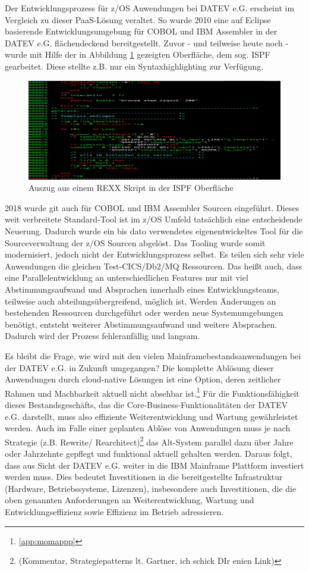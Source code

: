 Der Entwicklungsprozess für z/OS Anwendungen bei DATEV e.G. erscheint im Vergleich zu dieser PaaS-Lösung veraltet.
So wurde 2010 eine auf Eclipse basierende Entwicklungsumgebung für COBOL und IBM Assembler in der DATEV e.G. flächendeckend bereitgestellt.
Zuvor - und teilweise heute noch -  wurde mit Hilfe der in Abbildung \ref{fig:3270} gezeigten Oberfläche, dem sog. ISPF gearbeitet.
Diese stellte z.B. nur ein Syntaxhighlighting zur Verfügung.
\begin{figure}[h]
\centering
\includegraphics[width=\textwidth]{figures/rexxintso.png}
\caption{Auszug aus einem REXX Skript in der ISPF Oberfläche}
\label{fig:3270}
\end{figure}
2018 wurde git auch für COBOL und IBM Assembler Sourcen eingeführt.
Dieses weit verbreitete Standard-Tool ist im z/OS Umfeld tatsächlich eine entscheidende Neuerung.
Dadurch wurde ein bis dato verwendetes eigenentwickeltes Tool für die Sourceverwaltung der z/OS Sourcen abgelöst.
Das Tooling wurde somit modernisiert, jedoch nicht der Entwicklungsprozess selbst.
Es teilen sich sehr viele Anwendungen die gleichen Test-CICS/Db2/MQ Ressourcen.
Das heißt auch, dass eine Parallelentwicklung an unterschiedlichen Features nur mit viel Abstimmungsaufwand und Absprachen innerhalb eines Entwicklungsteams, teilweise auch abteilungsübergreifend, möglich ist.
Werden Änderungen an bestehenden Ressourcen durchgeführt oder werden neue Systemumgebungen benötigt, entsteht weiterer Abstimmungsaufwand und weitere Absprachen.
Dadurch wird der Prozess fehleranfällig und langsam.

Es bleibt die Frage, wie wird mit den vielen Mainframebestandsanwendungen bei der DATEV e.G. in Zukunft umgegangen?
Die komplette Ablösung dieser Anwendungen durch cloud-native Lösungen ist eine Option, deren zeitlicher Rahmen und Machbarkeit aktuell nicht absehbar ist.\footnote{\ref{app:momappp} }
Für die Funktionsfähigkeit dieses Bestandsgeschäfts, das die Core-Business-Funktionalitäten der DATEV e.G. darstellt, muss also effiziente Weiterentwicklung und Wartung gewährleistet werden.
Auch im Falle einer geplanten Ablöse von Anwendungen muss je nach Strategie (z.B. \glqq Rewrite\grqq / \glqq Rearchitect\grqq)\footnote{(Kommentar, Strategiepatterns lt. Gartner, ich schick DIr enien Link)} das Alt-System parallel dazu über Jahre oder Jahrzehnte gepflegt und funktional aktuell gehalten werden.
Daraus folgt, dass aus Sicht der DATEV e.G. weiter in die IBM Mainframe Plattform investiert werden muss. 
Dies bedeutet Investitionen in die bereitgestellte Infrastruktur (Hardware, Betriebssysteme, Lizenzen), insbesondere auch Investitionen, die die oben genannten Anforderungen an Weiterentwicklung, Wartung und Entwicklungseffizienz sowie Effizienz im Betrieb adressieren.

